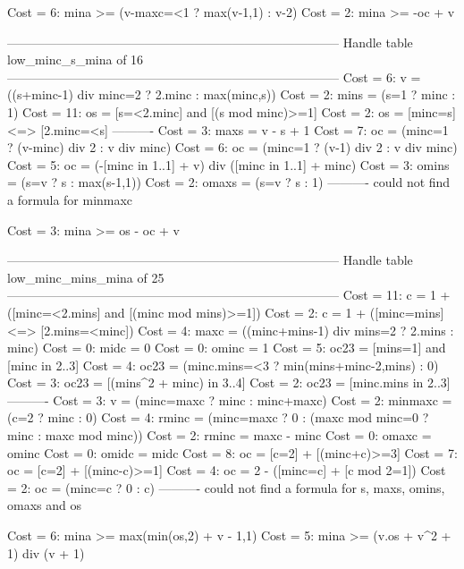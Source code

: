 Cost =  6:  mina >= (v-maxc=<1 ? max(v-1,1) : v-2)
Cost =  2:  mina >= -oc + v

--------------------------------------------------------------------------------
Handle table low_minc_s_mina of 16
--------------------------------------------------------------------------------
Cost =  6:  v       = ((s+minc-1) div minc=2 ? 2.minc : max(minc,s))
Cost =  2:  mins    = (s=1 ? minc : 1)
Cost = 11:  os      = [s=<2.minc] and [(s mod minc)>=1]
Cost =  2:  os      = [minc=s] <=> [2.minc=<s]
----------
Cost =  3:  maxs    = v - s + 1
Cost =  7:  oc      = (minc=1 ? (v-minc) div 2 : v div minc)
Cost =  6:  oc      = (minc=1 ? (v-1) div 2 : v div minc)
Cost =  5:  oc      = (-[minc in 1..1] + v) div ([minc in 1..1] + minc)
Cost =  3:  omins   = (s=v ? s : max(s-1,1))
Cost =  2:  omaxs   = (s=v ? s : 1)
----------
could not find a formula for minmaxc

Cost =  3:  mina >= os - oc + v

--------------------------------------------------------------------------------
Handle table low_minc_mins_mina of 25
--------------------------------------------------------------------------------
Cost = 11:  c       = 1 + ([minc=<2.mins] and [(minc mod mins)>=1])
Cost =  2:  c       = 1 + ([minc=mins] <=> [2.mins=<minc])
Cost =  4:  maxc    = ((minc+mins-1) div mins=2 ? 2.mins : minc)
Cost =  0:  midc    = 0
Cost =  0:  ominc   = 1
Cost =  5:  oc23    = [mins=1] and [minc in 2..3]
Cost =  4:  oc23    = (minc.mins=<3 ? min(mins+minc-2,mins) : 0)
Cost =  3:  oc23    = [(mins^2 + minc) in 3..4]
Cost =  2:  oc23    = [minc.mins in 2..3]
----------
Cost =  3:  v       = (minc=maxc ? minc : minc+maxc)
Cost =  2:  minmaxc = (c=2 ? minc : 0)
Cost =  4:  rminc   = (minc=maxc ? 0 : (maxc mod minc=0 ? minc : maxc mod minc))
Cost =  2:  rminc   = maxc - minc
Cost =  0:  omaxc   = ominc
Cost =  0:  omidc   = midc
Cost =  8:  oc      = [c=2] + [(minc+c)>=3]
Cost =  7:  oc      = [c=2] + [(minc-c)>=1]
Cost =  4:  oc      = 2 - ([minc=c] + [c mod 2=1])
Cost =  2:  oc      = (minc=c ? 0 : c)
----------
could not find a formula for s, maxs, omins, omaxs and os

Cost =  6:  mina >= max(min(os,2) + v - 1,1)
Cost =  5:  mina >= (v.os + v^2 + 1) div (v + 1)

